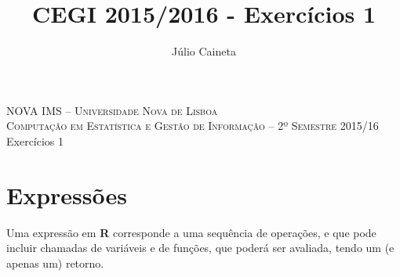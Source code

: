 \documentclass{exam}
\author{Júlio Caineta}
\title{CEGI 2015/2016 - Exercícios 1}
\begin{document}
 
\begin{center}
\textsc {\small NOVA IMS -- Universidade Nova de Lisboa} \\
\textsc {Computação em Estatística e Gestão de Informação -- 2º Semestre 2015/16}
\vspace{5mm} \\
{\large Exercícios 1}
\end{center}
 
\vspace{5mm}

\section{Expressões}
Uma expressão em \textbf{R} corresponde a uma sequência de operações, e que pode incluir chamadas de variáveis e de funções, que poderá ser avaliada, tendo um (e apenas um) retorno.
 
\end{document}
